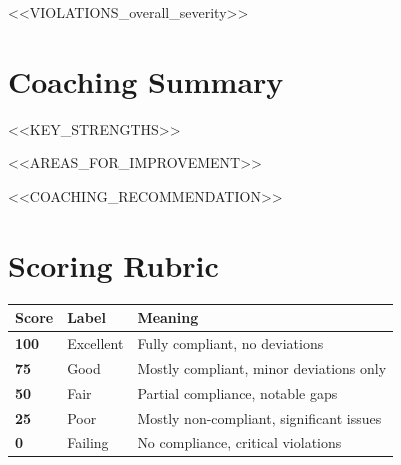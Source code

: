 \documentclass[12pt,a4paper]{article}
\begin{document}
\begin{tcolorbox}[violationbox]
\begin{itemize}[leftmargin=1.2em, itemsep=2pt, topsep=0pt]
<<VIOLATIONS_overall_severity>>
\end{itemize}
\end{tcolorbox}

\vspace{1em}

\section{Coaching Summary}

\begin{tcolorbox}[strengthbox]
\begin{itemize}[leftmargin=1.2em, itemsep=3pt, topsep=0pt]
<<KEY_STRENGTHS>>
\end{itemize}
\end{tcolorbox}

\begin{tcolorbox}[improvebox]
\begin{itemize}[leftmargin=1.2em, itemsep=3pt, topsep=0pt]
<<AREAS_FOR_IMPROVEMENT>>
\end{itemize}
\end{tcolorbox}

\begin{tcolorbox}[coachbox]
<<COACHING_RECOMMENDATION>>
\end{tcolorbox}

\vspace{1em}

\section{Scoring Rubric}

\begin{center}
\begin{tabular}{C{1.5cm} C{2cm} l}
\toprule
\textbf{Score} & \textbf{Label} & \textbf{Meaning} \\
\midrule
\textcolor{score100}{\textbf{100}} & Excellent & Fully compliant, no deviations \\
\textcolor{score75}{\textbf{75}}   & Good      & Mostly compliant, minor deviations only \\
\textcolor{score50}{\textbf{50}}   & Fair      & Partial compliance, notable gaps \\
\textcolor{score25}{\textbf{25}}   & Poor      & Mostly non-compliant, significant issues \\
\textcolor{score0}{\textbf{0}}     & Failing   & No compliance, critical violations \\
\bottomrule
\end{tabular}
\end{center}
\end{document}
